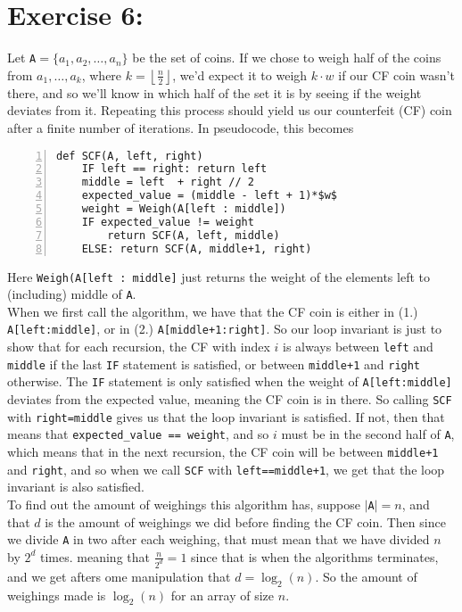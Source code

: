 \documentclass{article}
\begin{document}
\section*{Exercise 6:}
Let \texttt{A}$ = \{a_1,a_2,\ldots,a_{n}\} $ be the set of coins. If we chose to 
weigh half of the coins from $a_1,\ldots,a_{k}$, where $k= \left\lfloor 
\frac{n}{2}\right\rfloor$, we'd expect it to weigh  $k\cdot w$ if our
CF coin wasn't there, and so we'll know in which half of the set it is by
seeing if the weight deviates from it. Repeating this process should 
yield us our counterfeit (CF) coin after a finite number of iterations.
In pseudocode, this becomes
\begin{lstlisting}[numbers = left]
def SCF(A, left, right)
    IF left == right: return left
    middle = left  + right // 2
    expected_value = (middle - left + 1)*$w$
    weight = Weigh(A[left : middle]) 
    IF expected_value != weight
        return SCF(A, left, middle)
    ELSE: return SCF(A, middle+1, right)
\end{lstlisting}
Here \texttt{Weigh(A[left : middle]} just returns the weight of the
elements left to (including) middle of \texttt{A}. \\
When we first call the algorithm, we have that the CF coin is either
in (1.) \texttt{A[left:middle]}, or in (2.) \texttt{A[middle+1:right]}.
So our loop invariant is just to show that for each recursion, the CF 
with index $i$ is always between  \texttt{left} and \texttt{middle} if 
the last  \texttt{IF}  statement is satisfied, or between 
\texttt{middle+1} and  \texttt{right} otherwise.
The \texttt{IF} statement is only satisfied when the weight of 
\texttt{A[left:middle]} deviates from the expected value, meaning the
CF coin is in there. So calling  \texttt{SCF} with  \texttt{right=middle}
gives us that the loop invariant is satisfied.
\newpage 
\noindent If not, then that means that \texttt{expected\_value == weight}, and so 
$i$ must be in the second half of \texttt{A}, which means that in the 
next recursion, the  CF coin will be between \texttt{middle+1} and
\texttt{right}, and so when we call  \texttt{SCF} with  
\texttt{left==middle+1}, we get that the loop invariant is also
satisfied. \\
To find out the amount of weighings this algorithm has, suppose 
$|$\texttt{A}$|=n$, and that $d$ is the amount of weighings we did before 
finding the CF coin. Then since we divide \texttt{A} in two after each 
weighing, that must mean that we have divided $n$ by $2^{d}$ times. 
meaning that $\frac{n}{2^{d}}=1$ since that is when the algorithms 
terminates, and we get afters ome manipulation that $d= \log_2(n)$.
So the amount of weighings made is $\log_2(n)$ for an array of size $n$.
\end{document}
